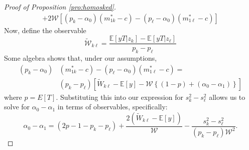 \begin{proof}[Proof of Proposition \ref{pro:homosked}]
\begin{align*}
  + 2\mathcal{W}\left[(p_k - \alpha_0)(m^*_{1k}-c) - (p_\ell - \alpha_0)(m^*_{1\ell}-c)\right]
\end{align*}
Now, define the observable
\begin{equation*}
  \widetilde{\mathcal{W}}_{k\ell} = \frac{\mathbb{E}[yT|z_k] - \mathbb{E}[yT|z_\ell]}{p_k - p_\ell}
\end{equation*}
Some algebra shows that, under our assumptions,
\begin{align*}
(p_k - \alpha_0)&(m^*_{1k}-c) - (p_\ell - \alpha_0)(m^*_{1\ell}-c) =\\
& (p_k - p_\ell)\left[ \widetilde{W}_{k\ell} - \mathbb{E}[y] - \mathcal{W}\left\{ (1 - p) + (\alpha_0 - \alpha_1) \right\} \right]
\end{align*}
where $p = E[T]$.
Substituting this into our expression for $s_k^2 - s_\ell^2$ allows us to solve for $\alpha_0 - \alpha_1$ in terms of observables, specifically:
\begin{equation*}
  \alpha_0 - \alpha_1 = (2p - 1 - p_k - p_\ell) + \frac{2(\widetilde{W}_{k\ell} - \mathbb{E}[y])}{\mathcal{W}} - \frac{s_k^2 - s_\ell^2}{(p_k - p_\ell)\mathcal{W}^2}.
\end{equation*}
\end{proof}

